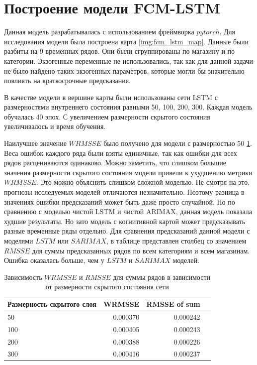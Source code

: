 \section{Построение модели FCM-LSTM}

Данная модель разрабатывалась с использованием фреймворка $ pytorch $.
Для исследования модели была построена карта \ref{img:fcm_lstm_map}.
Данные были разбиты на 9 временных рядов. Они были сгруппированы по
магазину и по категории. Экзогенные переменные не использовались,
так как для данной задачи не было найдено таких экзогенных параметров,
которые могли бы значительно повлиять на краткосрочные предсказания.

В качестве модели в вершине карты были использованы сети LSTM с размерностями
внутреннего состояния равными 50, 100, 200, 300. Каждая модель обучалась 40 эпох.
С увеличением размерности скрытого состояния увеличивалось и время обучения.

Наилучшее значение $ WRMSSE $ было получено для модели с размерностью 50 \ref{tbl:rmsse_fcm_lstm}.
Веса ошибок каждого ряда были взяты единичные, так как ошибки для всех рядов расцениваются одинаково.
Можно заметить, что слишком большие значения размерности скрытого состояния модели
привели к ухудшению метрики $ WRMSSE $. Это можно объяснить слишком сложной моделью.
Не смотря на это, прогнозы исследуемых моделей отличаются незначительно.
Поэтому разница в значениях ошибки предсказаний может быть даже просто случайной.
Но по сравнению с моделью чистой LSTM и чистой ARIMAX, данная модель показала худшие результаты.
Но зато модель с когнитивной картой может предсказывать разные временные ряды отдельно.
Для сравнения предсказаний данной модели с моделями $ LSTM $ или $ SARIMAX $, в
таблице представлен столбец со значением $ RMSSE $ для суммы предсказанных рядов
по всем категориям и всем магазинам. Ошибка оказалась больше, чем у  $ LSTM $ и $ SARIMAX $
моделей.

\begin{table}
    \caption{Зависимость $ WRMSSE $ и $ RMSSE $ для суммы рядов в зависимости от размерности скрытого состояния сети }
    \centering
    \begin{tabular}{|l|r||r|r|}
        \hline
            Размерность скрытого слоя &   WRMSSE & RMSSE of sum \\
        \hline
            50                         & 0.000370 & 0.000242 \\
            100                        & 0.000405 & 0.000243 \\
            200                        & 0.000388 & 0.000226 \\
            300                        & 0.000416 & 0.000237 \\
        \hline
    \end{tabular}
    \label{tbl:rmsse_fcm_lstm}
\end{table}

